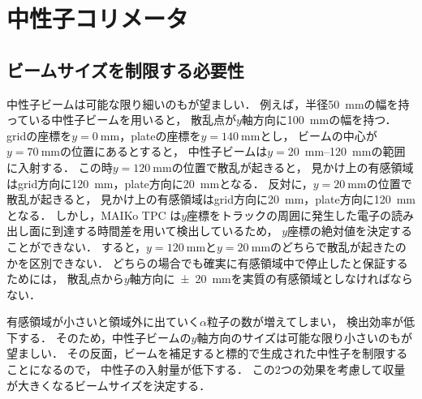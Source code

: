 \documentclass[../master]{subfiles}
\begin{document}
\chapter{中性子コリメータ}
\section{ビームサイズを制限する必要性}
中性子ビームは可能な限り細いのもが望ましい．
例えば，半径\SI{50}{\milli\metre}の幅を持っている中性子ビームを用いると，
散乱点が$y$軸方向に\SI{100}{\milli\metre}の幅を持つ．
gridの座標を$y = \SI{0}{\milli\metre}$，plateの座標を$y = \SI{140}{\milli\metre}$とし，
ビームの中心が$y = \SI{70}{\milli\metre}$の位置にあるとすると，
中性子ビームは$y = $\SIrange{20}{120}{\milli\metre}の範囲に入射する．
この時$y = \SI{120}{\milli\metre}$の位置で散乱が起きると，
見かけ上の有感領域はgrid方向に\SI{120}{\milli\metre}，plate方向に\SI{20}{\milli\metre}となる．
反対に，$y = \SI{20}{\milli\metre}$の位置で散乱が起きると，
見かけ上の有感領域はgrid方向に\SI{20}{\milli\metre}，plate方向に\SI{120}{\milli\metre}となる．
しかし，MAIKo TPC は$y$座標をトラックの周囲に発生した電子の読み出し面に到達する時間差を用いて検出しているため，
$y$座標の絶対値を決定することができない．
すると，$y = \SI{120}{\milli\metre}$と$y = \SI{20}{\milli\metre}$のどちらで散乱が起きたのかを区別できない．
どちらの場合でも確実に有感領域中で停止したと保証するためには，
散乱点から$y$軸方向に\SI{\pm20}{\milli\metre}を実質の有感領域としなければならない．

有感領域が小さいと領域外に出ていく$\alpha$粒子の数が増えてしまい，
検出効率が低下する．
そのため，中性子ビームの$y$軸方向のサイズは可能な限り小さいのもが望ましい．
その反面，ビームを補足すると標的で生成された中性子を制限することになるので，
中性子の入射量が低下する．
この2つの効果を考慮して収量が大きくなるビームサイズを決定する．
\end{document}
